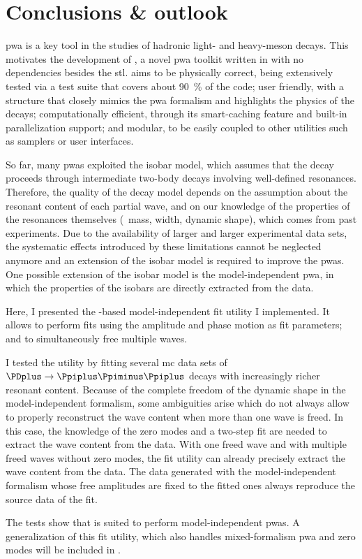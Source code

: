 \chapter{Conclusions \& outlook}

    \ac{pwa} is a key tool in the studies of hadronic light- and heavy-meson decays.
    This motivates the development of , a novel \ac{pwa} toolkit written in \cpp[11]{} with no dependencies besides the \ac{stl}.
     aims to be physically correct, being extensively tested via a test suite that covers about \SI{90}{\percent} of the code;
    user friendly, with a structure that closely mimics the \ac{pwa} formalism and highlights the physics of the decays;
    computationally efficient, through its smart-caching feature and built-in parallelization support;
    and modular, to be easily coupled to other utilities such as samplers or user interfaces.


    So far, many \acp{pwa} exploited the isobar model, which assumes that the decay proceeds through intermediate two-body decays involving well-defined resonances.
    Therefore, the quality of the decay model depends on the assumption about the resonant content of each partial wave, and on our knowledge of the properties of the resonances themselves (\eg~mass, width, dynamic shape), which comes from past experiments.
    Due to the availability of larger and larger experimental data sets, the systematic effects introduced by these limitations cannot be neglected anymore and an extension of the isobar model is required to improve the \acp{pwa}.
    One possible extension of the isobar model is the model-independent \ac{pwa}, in which the properties of the isobars are directly extracted from the data.

    
    Here, I presented the -based model-independent fit utility I implemented.
    It allows to perform fits using the amplitude and phase motion as fit parameters; and to simultaneously free multiple waves.


    I tested the utility by fitting several \ac{mc} data sets of $\PDplus\to\Ppiplus\Ppiminus\Ppiplus$ decays with increasingly richer resonant content.
    Because of the complete freedom of the dynamic shape in the model-independent formalism, some ambiguities arise which do not always allow to properly reconstruct the wave content when more than one wave is freed.
    In this case, the knowledge of the zero modes and a two-step fit are needed to extract the wave content from the data.
    With one freed wave and with multiple freed waves without zero modes, the fit utility can already precisely extract the wave content from the data.
    The data generated with the model-independent formalism whose free amplitudes are fixed to the fitted ones always reproduce the source data of the fit.


    The tests show that  is suited to perform model-independent \acp{pwa}.
    A generalization of this fit utility, which also handles mixed-formalism \ac{pwa} and zero modes will be included in .
